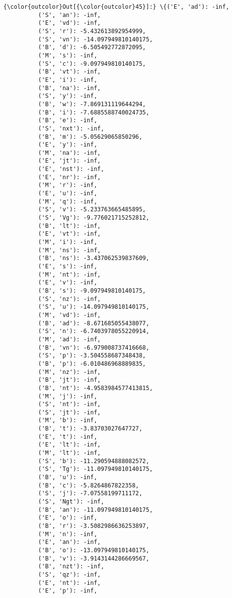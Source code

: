 \documentclass[11pt]{article}
\begin{document}
\begin{Verbatim}[commandchars=\\\{\}]
{\color{outcolor}Out[{\color{outcolor}45}]:} \{('E', 'ad'): -inf,
          ('S', 'an'): -inf,
          ('E', 'vd'): -inf,
          ('S', 'r'): -5.432613892954999,
          ('S', 'vn'): -14.097949810140175,
          ('B', 'd'): -6.505492772872095,
          ('M', 's'): -inf,
          ('S', 'c'): -9.097949810140175,
          ('B', 'vt'): -inf,
          ('E', 'i'): -inf,
          ('B', 'na'): -inf,
          ('S', 'y'): -inf,
          ('B', 'w'): -7.869131119644294,
          ('B', 'i'): -7.6885588740024735,
          ('B', 'e'): -inf,
          ('S', 'nxt'): -inf,
          ('B', 'm'): -5.05629065850296,
          ('E', 'y'): -inf,
          ('M', 'na'): -inf,
          ('E', 'jt'): -inf,
          ('E', 'nst'): -inf,
          ('E', 'nr'): -inf,
          ('M', 'r'): -inf,
          ('E', 'u'): -inf,
          ('M', 'q'): -inf,
          ('S', 'v'): -5.233763665485895,
          ('S', 'Vg'): -9.776021715252812,
          ('B', 'lt'): -inf,
          ('E', 'vt'): -inf,
          ('M', 'i'): -inf,
          ('M', 'ns'): -inf,
          ('B', 'ns'): -3.437062539837609,
          ('E', 's'): -inf,
          ('M', 'nt'): -inf,
          ('E', 'v'): -inf,
          ('B', 's'): -9.097949810140175,
          ('S', 'nz'): -inf,
          ('S', 'u'): -14.097949810140175,
          ('M', 'vd'): -inf,
          ('B', 'ad'): -8.671685055438077,
          ('S', 'n'): -6.7403978055220914,
          ('M', 'ad'): -inf,
          ('B', 'vn'): -6.979008737416668,
          ('S', 'p'): -3.504558687348438,
          ('B', 'p'): -6.010486968889835,
          ('M', 'nz'): -inf,
          ('B', 'jt'): -inf,
          ('B', 'nt'): -4.9583984577413815,
          ('M', 'j'): -inf,
          ('S', 'nt'): -inf,
          ('S', 'jt'): -inf,
          ('M', 'b'): -inf,
          ('B', 't'): -3.83703027647727,
          ('E', 't'): -inf,
          ('E', 'lt'): -inf,
          ('M', 'lt'): -inf,
          ('S', 'b'): -11.290594888082572,
          ('S', 'Tg'): -11.097949810140175,
          ('B', 'u'): -inf,
          ('B', 'c'): -5.8264867822358,
          ('S', 'j'): -7.07558199711172,
          ('S', 'Ngt'): -inf,
          ('B', 'an'): -11.097949810140175,
          ('E', 'o'): -inf,
          ('B', 'r'): -3.5082986636253897,
          ('M', 'n'): -inf,
          ('E', 'an'): -inf,
          ('B', 'o'): -13.097949810140175,
          ('B', 'v'): -3.9143144286669567,
          ('B', 'nzt'): -inf,
          ('S', 'qz'): -inf,
          ('E', 'nt'): -inf,
          ('E', 'p'): -inf,

\end{Verbatim}
\end{document}
